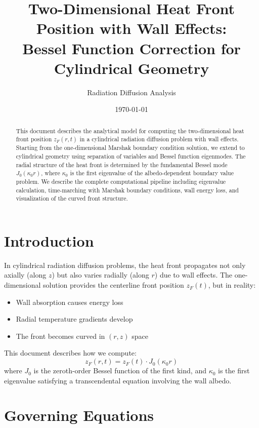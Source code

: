 \documentclass[12pt,a4paper]{article}
\title{Two-Dimensional Heat Front Position with Wall Effects:\\
Bessel Function Correction for Cylindrical Geometry}
\author{Radiation Diffusion Analysis}
\date{\today}
\begin{document}
\maketitle

\begin{abstract}
This document describes the analytical model for computing the two-dimensional heat front position $z_F(r,t)$ in a cylindrical radiation diffusion problem with wall effects. Starting from the one-dimensional Marshak boundary condition solution, we extend to cylindrical geometry using separation of variables and Bessel function eigenmodes. The radial structure of the heat front is determined by the fundamental Bessel mode $J_0(\kappa_0 r)$, where $\kappa_0$ is the first eigenvalue of the albedo-dependent boundary value problem. We describe the complete computational pipeline including eigenvalue calculation, time-marching with Marshak boundary conditions, wall energy loss, and visualization of the curved front structure.
\end{abstract}

\tableofcontents
\newpage

\section{Introduction}

In cylindrical radiation diffusion problems, the heat front propagates not only axially (along $z$) but also varies radially (along $r$) due to wall effects. The one-dimensional solution provides the centerline front position $z_F(t)$, but in reality:
\begin{itemize}
    \item Wall absorption causes energy loss
    \item Radial temperature gradients develop
    \item The front becomes curved in $(r,z)$ space
\end{itemize}

This document describes how we compute:
\begin{equation}
z_F(r,t) = z_F(t) \cdot J_0(\kappa_0 r)
\end{equation}
where $J_0$ is the zeroth-order Bessel function of the first kind, and $\kappa_0$ is the first eigenvalue satisfying a transcendental equation involving the wall albedo.

\section{Governing Equations}
\end{document}
